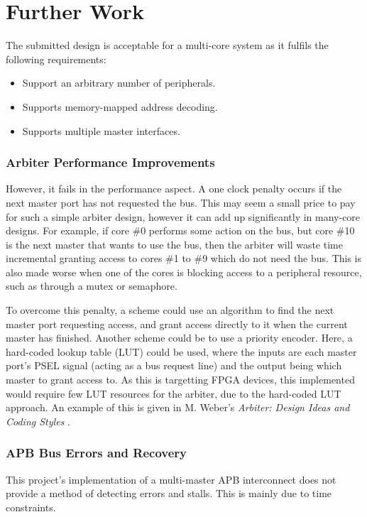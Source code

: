 \section{Further Work}
The submitted design is acceptable for a multi-core system as it fulfils the following requirements:
\begin{itemize}
\item Support an arbitrary number of peripherals.
\item Supports memory-mapped address decoding.
\item Supports multiple master interfaces.
\end{itemize}

\subsubsection*{Arbiter Performance Improvements}
However, it fails in the performance aspect. A one clock penalty occurs if the next master port has not requested the bus. This may seem a small price to pay for such a simple arbiter design, however it can add up significantly in many-core designs. For example, if core \#0 performs some action on the bus, but core \#10 is the next  master that wants to use the bus, then the arbiter will waste time incremental granting access to cores \#1 to \#9 which do not need the bus. This is also made worse when one of the cores is blocking access to a peripheral resource, such as through a mutex or semaphore.

To overcome this penalty, a scheme could use an algorithm to find the next master port requesting access, and grant access directly to it when the current master has finished. Another scheme could be to use a priority encoder. Here, a hard-coded lookup table (LUT) could be used, where the inputs are each master port's PSEL signal (acting as a bus request line) and the output being which master to grant access to. As this is targetting FPGA devices, this implemented would require few LUT resources for the arbiter, due to the hard-coded LUT approach. An example of this is given in M. Weber's \textit{Arbiter: Design Ideas and Coding Styles} \cite[p.~2]{weber2001arbiters}.

\subsubsection*{APB Bus Errors and Recovery}
This project's implementation of a multi-master APB interconnect does not provide a method of detecting errors and stalls. This is mainly due to time constraints.

